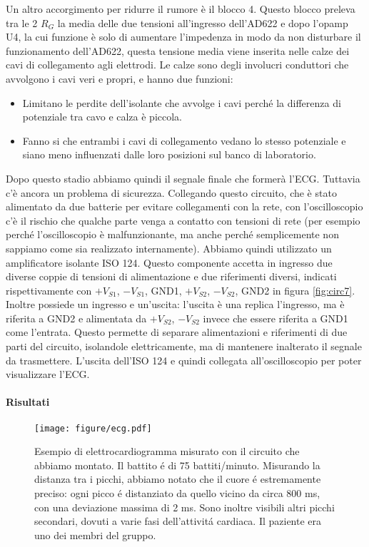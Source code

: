 Un altro accorgimento per ridurre il rumore è il blocco 4. Questo blocco preleva tra le 2 $R_G$ la media
delle due tensioni all'ingresso dell'AD622 e dopo l'opamp U4, la cui funzione è solo di
aumentare l'impedenza in modo da non disturbare il funzionamento dell'AD622, questa tensione media viene
inserita nelle calze dei cavi di collegamento agli elettrodi. Le calze sono degli involucri conduttori che avvolgono i
cavi veri e propri, e hanno due funzioni:

\begin{itemize}
    \item{Limitano le perdite dell'isolante che avvolge i cavi perché la differenza di potenziale tra cavo e calza è
        piccola.}
    \item{Fanno si che entrambi i cavi di collegamento vedano lo stesso potenziale e siano meno influenzati dalle loro
        posizioni sul banco di laboratorio.}
\end{itemize}

Dopo questo stadio abbiamo quindi il segnale finale che formerà l'ECG. Tuttavia c'è ancora un problema
di sicurezza. Collegando questo circuito, che è stato alimentato da due batterie
per evitare collegamenti con la rete, con l'oscilloscopio c'è il rischio che qualche parte venga
a contatto con tensioni di rete (per esempio perché l'oscilloscopio è malfunzionante, ma anche perché
semplicemente non sappiamo come sia realizzato internamente). Abbiamo quindi utilizzato un amplificatore
isolante ISO 124. Questo componente accetta in ingresso due diverse coppie di tensioni di alimentazione e due
riferimenti diversi, indicati rispettivamente con $+V_{S1}$, $-V_{S1}$, GND1, $+V_{S2}$, $-V_{S2}$, GND2 in
figura \ref{fig:circ7}.
Inoltre possiede un ingresso e un'uscita: l'uscita è una replica l'ingresso, ma è riferita a GND2 e alimentata
da $+V_{S2}$, $-V_{S2}$ invece che essere riferita a GND1 come l'entrata. Questo permette di separare
alimentazioni e riferimenti di due parti del circuito, isolandole elettricamente, ma di mantenere inalterato il segnale
da trasmettere. L'uscita dell'ISO 124 e quindi collegata all'oscilloscopio per poter visualizzare l'ECG.

\paragraph{Risultati}

\begin{SCfigure*}[][p]
    \texttt{[image: figure/ecg.pdf]}
    \caption{Esempio di elettrocardiogramma misurato con il circuito che abbiamo montato.
        Il battito é di 75 battiti/minuto. Misurando la distanza tra i picchi,
        abbiamo notato che il cuore é estremamente preciso: ogni picco é distanziato da quello
        vicino da circa 800 ms, con una deviazione massima di 2 ms. Sono inoltre visibili altri
        picchi secondari, dovuti a varie fasi dell'attivitá cardiaca. Il paziente era uno dei
        membri del gruppo.}
    \label{fig:ecg7}
\end{SCfigure*}

